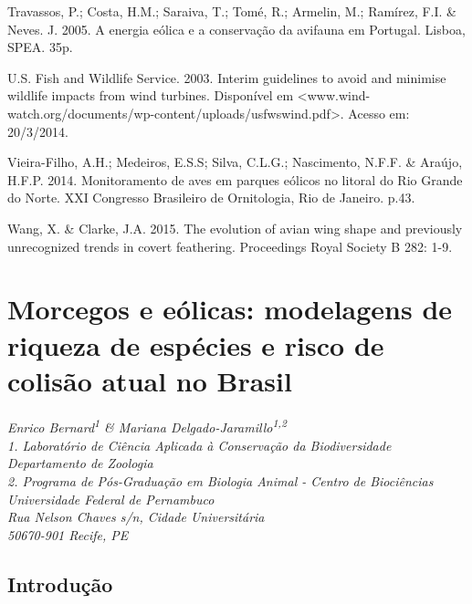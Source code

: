 \documentclass[
  oneside]{scrbook}
\begin{document}
Travassos, P.; Costa, H.M.; Saraiva, T.; Tomé, R.; Armelin, M.; Ramírez, F.I. \& Neves. J. 2005. A energia eólica e a conservação da avifauna em Portugal. Lisboa, SPEA. 35p.

U.S. Fish and Wildlife Service. 2003. Interim guidelines to avoid and minimise wildlife impacts from wind turbines. Disponível em \textless www.wind-watch.org/documents/wp-content/uploads/usfwswind.pdf\textgreater. Acesso em: 20/3/2014.

Vieira-Filho, A.H.; Medeiros, E.S.S; Silva, C.L.G.; Nascimento, N.F.F. \& Araújo, H.F.P. 2014. Monitoramento de aves em parques eólicos no litoral do Rio Grande do Norte. XXI Congresso Brasileiro de Ornitologia, Rio de Janeiro. p.43.

Wang, X. \& Clarke, J.A. 2015. The evolution of avian wing shape and previously unrecognized trends in covert feathering. Proceedings Royal Society B 282: 1-9.

\hypertarget{morcegos}{%
\chapter{Morcegos e eólicas: modelagens de riqueza de espécies e risco de colisão atual no Brasil}\label{morcegos}}

\emph{Enrico Bernard\textsuperscript{1} \& Mariana Delgado-Jaramillo\textsuperscript{1,2}}\\
\emph{1. Laboratório de Ciência Aplicada à Conservação da Biodiversidade Departamento de Zoologia}\\
\emph{2. Programa de Pós-Graduação em Biologia Animal - Centro de Biociências}\\
\emph{Universidade Federal de Pernambuco}\\
\emph{Rua Nelson Chaves s/n, Cidade Universitária}\\
\emph{50670-901 Recife, PE}

\hypertarget{introducao}{%
\section{Introdução}\label{introducao}}
\end{document}
